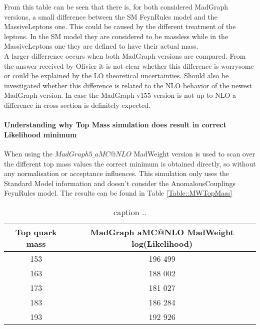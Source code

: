 From this table can be seen that there is, for both considered MadGraph versions, a small difference between the SM FeynRules model and the MassiveLeptons one. This could be caused by the different treatment of the leptons. In the SM model they are considered to be massless while in the MassiveLeptons one they are defined to have their actual mass.\\
A larger differrence occurs when both MadGraph versions are compared. From the answer received by Olivier it is not clear whether this difference is worrysome or could be explained by the LO theoretical uncertainties. Should also be investigated whether this difference is related to the NLO behavior of the newest MadGraph version. In case the MadGraph v155 version is not up to NLO a difference in cross section is definitely expected.

\paragraph{Understanding why Top Mass simulation does result in correct Likelihood minimum\\}
When using the $MadGraph5\_aMC@NLO$ MadWeight version is used to scan over the different top mass values the correct minimum is obtained directly, so without any normalisation or acceptance influences. This simulation only uses the Standard Model information and doesn't consider the AnomalousCouplings FeynRules model.
The results can be found in Table \ref{Table::MWTopMass}

\begin{table}[h!]
 \centering
 \begin{tabular}{|c|c|}
  \hline
  Top quark mass	&  MadGraph aMC@NLO MadWeight log(Likelihood)\\
  \hline
    153 		& 196 499	\\
    163			& 188 002	\\
    173			& 181 027	\\
    183			& 186 284	\\
    193			& 192 926	\\
  \hline 
 \end{tabular} 
 \caption{ caption ..} \label{table::MGXS}
\end{table}


